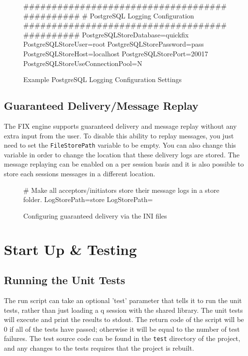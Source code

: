 \begin{figure}[H]
\begin{inicode}
	##############################################
	#       PostgreSQL Logging Configuration 
	##############################################
	PostgreSQLStoreDatabase=quickfix
	PostgreSQLStoreUser=root
	PostgreSQLStorePassword=pass
	PostgreSQLStoreHost=localhost
	PostgreSQLStorePort=20017
	PostgreSQLStoreUseConnectionPool=N
\end{inicode}
\caption{Example PostgreSQL Logging Configuration Settings}
\end{figure}

\subsection{Guaranteed Delivery/Message Replay}

The FIX engine supports guaranteed delivery and message replay without any extra input from the user. To disable this ability to replay messages, you just need to set the \verb|FileStorePath| variable to be empty. You can also change this variable in order to change the location that these delivery logs are stored. The message replaying can be enabled on a per session basis and it is also possible to store each sessions messages in a different location.

\begin{figure}[H]
\begin{inicode}
[DEFAULT]
# Make all acceptors/initiators store their message logs in a store folder.
LogStorePath=store
LogStorePath=
\end{inicode}
\caption{Configuring guaranteed delivery via the INI files}
\end{figure}

\section{Start Up \& Testing}

\subsection{Running the Unit Tests}

The run script can take an optional 'test' parameter that tells it to run the unit tests, rather
than just loading a q session with the shared library. The unit tests will execute and print the
results to stdout. The return code of the script will be 0 if all of the tests have passed; otherwise
it will be equal to the number of test failures. The test source code can be found in the \verb|test| directory of the project, and any changes to the tests requires that the project is rebuilt.

